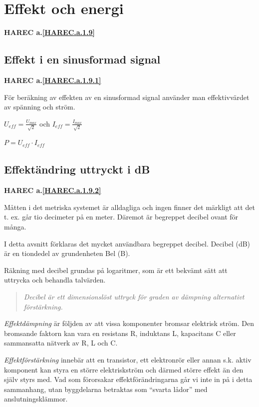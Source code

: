 \section{Effekt och energi}
\textbf{HAREC a.\ref{HAREC.a.1.9}\label{myHAREC.a.1.9}}
\label{effect och energi}

\subsection{Effekt i en sinusformad signal}
\textbf{HAREC a.\ref{HAREC.a.1.9.1}\label{myHAREC.a.1.9.1}}

För beräkning av effekten av en sinusformad signal använder man effektivvärdet
av spänning och ström.

\(U_{eff} = \frac{U_{max}}{\sqrt{2}}\) och \(I_{eff} = \frac{I_{max}}{\sqrt{2}}\)

\(P = U_{eff} \cdot I_{eff}\)

\subsection{Effektändring uttryckt i dB}
\textbf{HAREC a.\ref{HAREC.a.1.9.2}\label{myHAREC.a.1.9.2}}

Måtten i det metriska systemet är alldagliga och ingen finner det märkligt att
det t. ex. går tio decimeter på en meter. Däremot är begreppet decibel ovant för
många.

I detta avsnitt förklaras det mycket användbara begreppet decibel. Decibel (dB)
är en tiondedel av grundenheten Bel (B).

Räkning med decibel grundas på logaritmer, som är ett bekvämt sätt att uttrycka
och behandla talvärden.

\begin{quote}\emph{
Decibel är ett dimensionslöst uttryck för graden av dämpning alternativt
förstärkning.
}\end{quote}

\emph{Effektdämpning} är följden av att vissa komponenter bromsar elektrisk ström. Den
bromsande faktorn kan vara en resistans R, induktans L, kapacitans C eller
sammansatta nätverk av R, L och C.

\emph{Effektförstärkning} innebär att en transistor, ett elektronrör eller annan s.k.
aktiv komponent kan styra en större elektriskström och därmed större effekt än
den själv styrs med. Vad som förorsakar effektförändringarna går vi inte in på i
detta sammanhang, utan byggdelarna betraktas som ``svarta lådor'' med
anslutningsklämmor.

